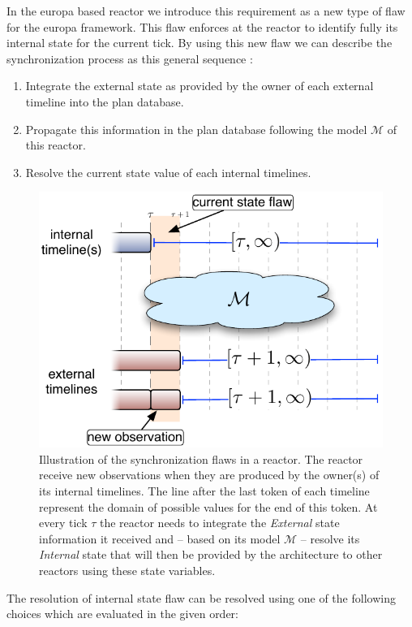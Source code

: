 In the europa based reactor we introduce this requirement as a new
type of flaw for the europa framework. This flaw enforces at the
reactor to identify fully its internal state for the current tick. By
using this new flaw we can describe the synchronization process as
this general sequence :

\begin{enumerate}

\item Integrate the external state as provided by the owner of each
  external timeline into the plan database.

\item Propagate this information in the plan database following the
  model $\mathcal{M}$ of this reactor.

\item Resolve the current state value of each internal timelines.

\end{enumerate}

\begin{figure}[!htbp]
  \centering
  \includegraphics[width=0.5\columnwidth]{figs/synch-relation}
  \caption{Illustration of the synchronization flaws in a reactor. The
    reactor receive new observations when they are produced by the
    owner(s) of its internal timelines. The line after the last token
    of each timeline represent the domain of possible values for the
    end of this token. At every tick $\tau$ the reactor needs to
    integrate the {\em External} state information it received and --
    based on its model $\mathcal{M}$ -- resolve its {\em Internal}
    state that will then be provided by the architecture to other
    reactors using these state variables.}
  \label{fig:synch:flaw}
\end{figure}

The resolution of internal state flaw can be resolved using one of the
following choices which are evaluated in the given order:

